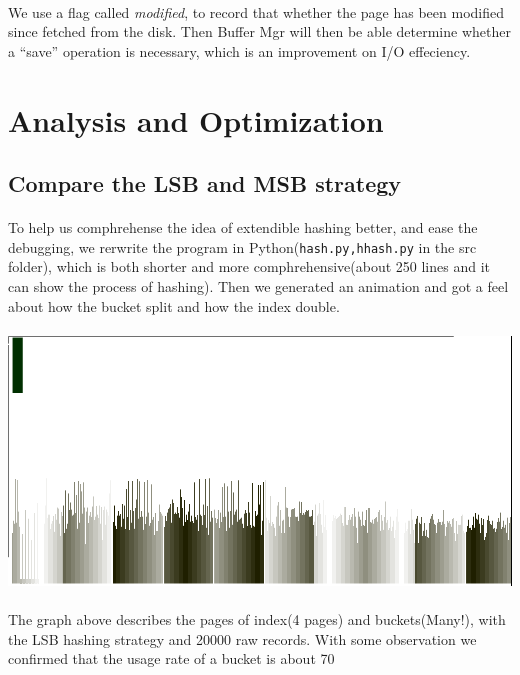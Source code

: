 \documentclass{article}
\begin{document}
            \paragraph{}
                We use a flag called \emph{modified}, to record that whether the page has been modified since fetched from the disk. Then Buffer Mgr will then be able determine whether a ``save'' operation is necessary, which is an improvement on I/O effeciency.
\section{Analysis and Optimization}
    \subsection{Compare the LSB and MSB strategy}
        \paragraph{}
            To help us comphrehense the idea of extendible hashing better, and ease the debugging, we rerwrite the program in Python(\verb|hash.py,hhash.py| in the src folder), which is both shorter and more comphrehensive(about 250 lines and it can show the process of hashing). Then we generated an animation and got a feel about how the bucket split and how the index double.
        \paragraph{} \includegraphics[scale=0.4]{img/pic20000_l.png}
        \paragraph{}
            The graph above describes the pages of index(4 pages) and buckets(Many!), with the LSB hashing strategy and 20000 raw records. With some observation we confirmed that the usage rate of a bucket is about 70%
\end{document}
